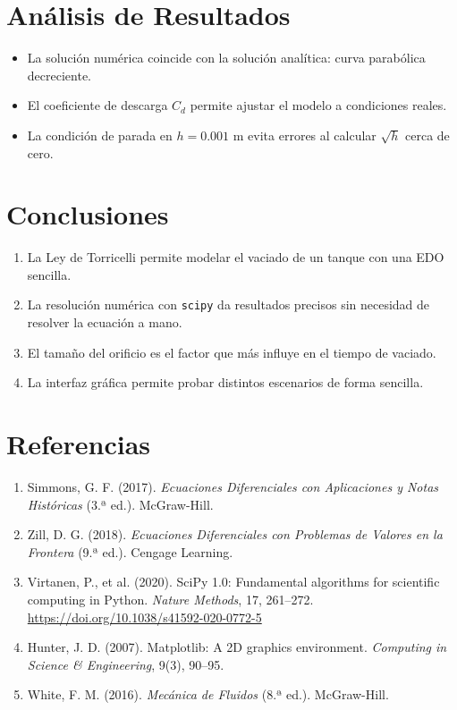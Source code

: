 \documentclass[12pt, a4paper]{article}
\begin{document}
\section{Análisis de Resultados}

\begin{itemize}
    \item La solución numérica coincide con la solución analítica: curva parabólica decreciente.
    \item El coeficiente de descarga $C_d$ permite ajustar el modelo a condiciones reales.
    \item La condición de parada en $h = 0.001$ m evita errores al calcular $\sqrt{h}$ cerca de cero.
\end{itemize}

\section{Conclusiones}

\begin{enumerate}
    \item La Ley de Torricelli permite modelar el vaciado de un tanque con una EDO sencilla.
    \item La resolución numérica con \texttt{scipy} da resultados precisos sin necesidad
          de resolver la ecuación a mano.
    \item El tamaño del orificio es el factor que más influye en el tiempo de vaciado.
    \item La interfaz gráfica permite probar distintos escenarios de forma sencilla.
\end{enumerate}

\section{Referencias}

\begin{enumerate}
    \item Simmons, G. F. (2017). \textit{Ecuaciones Diferenciales con Aplicaciones
          y Notas Históricas} (3.ª ed.). McGraw-Hill.
    \item Zill, D. G. (2018). \textit{Ecuaciones Diferenciales con Problemas
          de Valores en la Frontera} (9.ª ed.). Cengage Learning.
    \item Virtanen, P., et al. (2020). SciPy 1.0: Fundamental algorithms for
          scientific computing in Python. \textit{Nature Methods}, 17, 261--272.
          \url{https://doi.org/10.1038/s41592-020-0772-5}
    \item Hunter, J. D. (2007). Matplotlib: A 2D graphics environment.
          \textit{Computing in Science \& Engineering}, 9(3), 90--95.
    \item White, F. M. (2016). \textit{Mecánica de Fluidos} (8.ª ed.). McGraw-Hill.
\end{enumerate}
\end{document}
